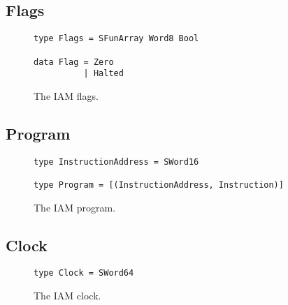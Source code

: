 \subsection{Flags}

\begin{figure}[H]
\begin{verbatim}
type Flags = SFunArray Word8 Bool

data Flag = Zero
          | Halted
\end{verbatim}
\label{flags}
\caption{The IAM flags.}
\end{figure}

\subsection{Program}

\begin{figure}[H]
\begin{verbatim}
type InstructionAddress = SWord16

type Program = [(InstructionAddress, Instruction)]
\end{verbatim}
\label{program}
\caption{The IAM program.}
\end{figure}

\subsection{Clock}

\begin{figure}[H]
\begin{verbatim}
type Clock = SWord64
\end{verbatim}
\label{clock}
\caption{The IAM clock.}
\end{figure}